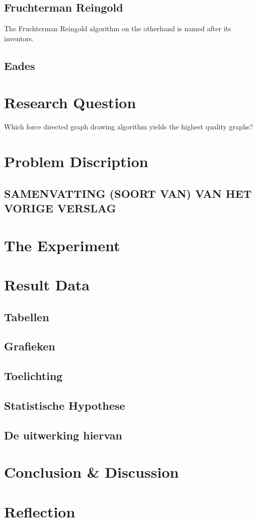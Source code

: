 \documentclass[a4paper,12pt]{article}
\begin{document}
    \subsection{Fruchterman Reingold}
    The Fruchterman Reingold algorithm on the otherhand is named after its inventors.\cite{fruchterman1991graph}


    \subsection{Eades}

  \section{Research Question}   %
    Which force directed graph drawing algorithm yields the highest quality graphs?

  \section{Problem Discription}
  \subsection{SAMENVATTING (SOORT VAN) VAN HET VORIGE VERSLAG}

  \section{The Experiment} %

  \section{Result Data} %
  \subsection{Tabellen} %
  \subsection{Grafieken}
  \subsection{Toelichting}
  \subsection{Statistische Hypothese}
  \subsection{De uitwerking hiervan}

  \section{Conclusion & Discussion}
  \section{Reflection}

  {}
  
\end{document}
